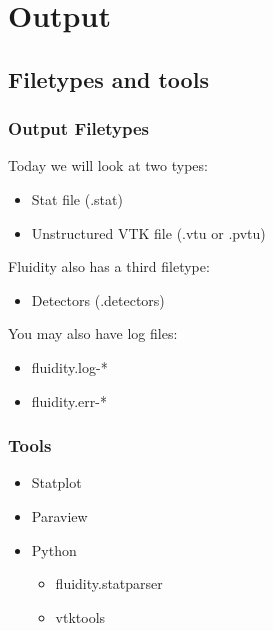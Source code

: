 \documentclass[12pt]{beamer}
\begin{document}



\section{Output}

\subsection{Filetypes and tools}
\begin{frame}
    \frametitle{Output Filetypes}
Today we will look at two types:
\begin{itemize}
    \item Stat file (.stat)
    \item Unstructured VTK file (.vtu or .pvtu)
\end{itemize}
\vspace{5mm}
Fluidity also has a third filetype:
\begin{itemize}
\item Detectors (.detectors)
\end{itemize}
\vspace{5mm}
You may also have log files:
\begin{itemize}
    \item fluidity.log-*
    \item fluidity.err-*
\end{itemize}

\end{frame}

\begin{frame}
    \frametitle{Tools}
\begin{itemize}
\item Statplot
\item Paraview
\item Python
    \begin{itemize}
    \item fluidity.statparser
    \item vtktools
    \end{itemize}
\end{itemize}
\end{frame}
\end{document}
